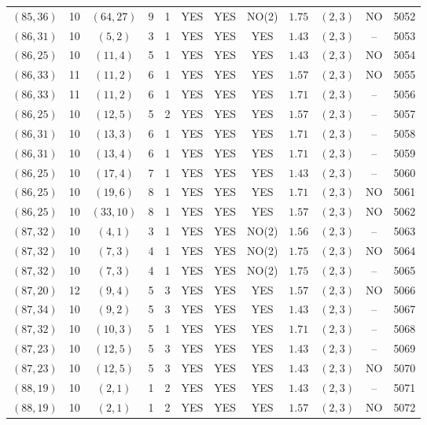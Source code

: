 \begin{longtable}{|c|c|c|c|c|c|c|c|c|c|c|c|}
$(85,36)$ & 10 & $(64,27)$ & 9 & 1 & YES & YES & NO(2) & $1.75$ & $(2,3)$ & NO & 5052\\
$(86,31)$ & 10 & $(5,2)$ & 3 & 1 & YES & YES & YES & $1.43$ & $(2,3)$ & -- & 5053\\
$(86,25)$ & 10 & $(11,4)$ & 5 & 1 & YES & YES & YES & $1.43$ & $(2,3)$ & NO & 5054\\
$(86,33)$ & 11 & $(11,2)$ & 6 & 1 & YES & YES & YES & $1.57$ & $(2,3)$ & NO & 5055\\
$(86,33)$ & 11 & $(11,2)$ & 6 & 1 & YES & YES & YES & $1.71$ & $(2,3)$ & -- & 5056\\
$(86,25)$ & 10 & $(12,5)$ & 5 & 2 & YES & YES & YES & $1.57$ & $(2,3)$ & -- & 5057\\
$(86,31)$ & 10 & $(13,3)$ & 6 & 1 & YES & YES & YES & $1.71$ & $(2,3)$ & -- & 5058\\
$(86,31)$ & 10 & $(13,4)$ & 6 & 1 & YES & YES & YES & $1.71$ & $(2,3)$ & -- & 5059\\
$(86,25)$ & 10 & $(17,4)$ & 7 & 1 & YES & YES & YES & $1.43$ & $(2,3)$ & -- & 5060\\
$(86,25)$ & 10 & $(19,6)$ & 8 & 1 & YES & YES & YES & $1.71$ & $(2,3)$ & NO & 5061\\
$(86,25)$ & 10 & $(33,10)$ & 8 & 1 & YES & YES & YES & $1.57$ & $(2,3)$ & NO & 5062\\
$(87,32)$ & 10 & $(4,1)$ & 3 & 1 & YES & YES & NO(2) & $1.56$ & $(2,3)$ & -- & 5063\\
$(87,32)$ & 10 & $(7,3)$ & 4 & 1 & YES & YES & NO(2) & $1.75$ & $(2,3)$ & NO & 5064\\
$(87,32)$ & 10 & $(7,3)$ & 4 & 1 & YES & YES & NO(2) & $1.75$ & $(2,3)$ & -- & 5065\\
$(87,20)$ & 12 & $(9,4)$ & 5 & 3 & YES & YES & YES & $1.57$ & $(2,3)$ & NO & 5066\\
$(87,34)$ & 10 & $(9,2)$ & 5 & 3 & YES & YES & YES & $1.43$ & $(2,3)$ & -- & 5067\\
$(87,32)$ & 10 & $(10,3)$ & 5 & 1 & YES & YES & YES & $1.71$ & $(2,3)$ & -- & 5068\\
$(87,23)$ & 10 & $(12,5)$ & 5 & 3 & YES & YES & YES & $1.43$ & $(2,3)$ & -- & 5069\\
$(87,23)$ & 10 & $(12,5)$ & 5 & 3 & YES & YES & YES & $1.43$ & $(2,3)$ & NO & 5070\\
$(88,19)$ & 10 & $(2,1)$ & 1 & 2 & YES & YES & YES & $1.43$ & $(2,3)$ & -- & 5071\\
$(88,19)$ & 10 & $(2,1)$ & 1 & 2 & YES & YES & YES & $1.57$ & $(2,3)$ & NO & 5072\\

\end{longtable}

